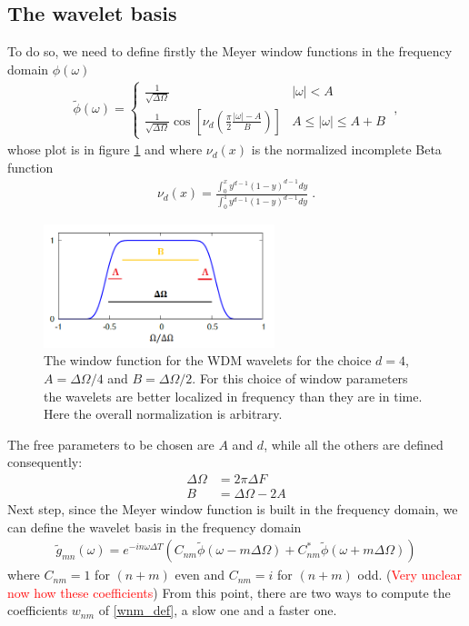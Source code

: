 \documentclass{article}
\begin{document}
\subsection{The wavelet basis}
To do so, we need to define firstly the Meyer window functions in the frequency domain $\phi(\omega)$
\begin{align}
\label{eq:meyer_window_freq}
\tilde\phi(\omega)=\left\{\begin{array}{lr}
\frac{1}{\sqrt{\Delta \Omega}} & |\omega|<A \\
\frac{1}{\sqrt{\Delta \Omega}} \cos \left[\nu_d\left(\frac{\pi}{2} \frac{|\omega|-A}{B}\right)\right] &A \leq|\omega| \leq A+B
\end{array}\right.\;,
\end{align}
whose plot is in figure \ref{fig:phi_omega} and where $\nu_d(x)$ is the normalized incomplete Beta function
\begin{align}
\nu_d(x)=\frac{\int_0^x y^{d-1}(1-y)^{d-1} d y}{\int_0^1 y^{d-1}(1-y)^{d-1} d y}\;.
\end{align}
%
\begin{figure}[ht!]
\centerline{
\includegraphics[width=0.6\textwidth,angle=0]{figures/phi_omega.png}
}
\caption{The window function for the WDM wavelets for the choice $d = 4$, $A =\Delta\Omega/4$ and $B = \Delta\Omega/2$. For this choice of window parameters the wavelets are better localized in frequency than they are in time. Here the overall normalization
is arbitrary.}
\label{fig:phi_omega}
\end{figure}
%
The free parameters to be chosen are $A$ and $d$, while all the others are defined consequently:
\begin{align}
\label{eq:window_bandwidth}
\Delta\Omega&=2\pi\Delta F\nonumber\\
B&=\Delta\Omega-2A
\end{align}
Next step, since the Meyer window function is built in the frequency domain, we can define the wavelet basis in the frequency domain
\begin{align}
\label{eq:gnm}
\tilde g_{mn}(\omega)=e^{-in\omega\Delta T}\left(C_{nm}\tilde\phi(\omega-m\Delta\Omega)+C^*_{nm}\tilde\phi(\omega+m\Delta\Omega)\right)
\end{align}
where $C_{nm}=1$ for $(n + m)$ even and $C_{nm}=i$ for $(n + m)$ odd.
(\textcolor{red}{Very unclear now how these coefficients})
From this point, there are two ways to compute the coefficients $w_{nm}$ of \eqref{wnm_def}, a slow one and a faster one.
\end{document}
